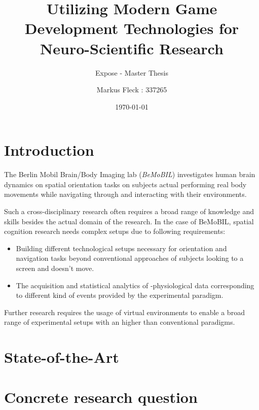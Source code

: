 \documentclass[	DIV=calc, paper=a4,	fontsize=11pt, twocolumn]{scrartcl}
\title{Utilizing Modern Game Development Technologies for Neuro-Scientific Research}					%
\subtitle{Expose - Master Thesis}
\author{Markus Fleck : 337265}
\date{\today}
\begin{document}
 

\maketitle

\begin{abstract}
\end{abstract}

\section*{Introduction}

The Berlin Mobil Brain/Body Imaging lab (\emph{BeMoBIL}) investigates human brain dynamics on spatial orientation tasks on subjects actual performing real body movements while navigating through and interacting with their environments. \cite{gramann2011cognition}

Such a cross-disciplinary research often requires a broad range of knowledge and skills besides the actual domain of the research.
In the case of BeMoBIL, spatial cognition research needs complex setups due to following requirements:
\begin{itemize} 
	\item Building different technological setups necessary for orientation and navigation tasks beyond conventional approaches of subjects looking to a screen and doesn't move.
	\item The acquisition and statistical analytics of -physiological data corresponding to different kind of events provided by the experimental paradigm.
\end{itemize}
Further research requires the usage of virtual environments to enable a broad range of experimental setups with an higher %
than conventional paradigms. 

\section*{State-of-the-Art}



\section*{Concrete research question}
\end{document}
